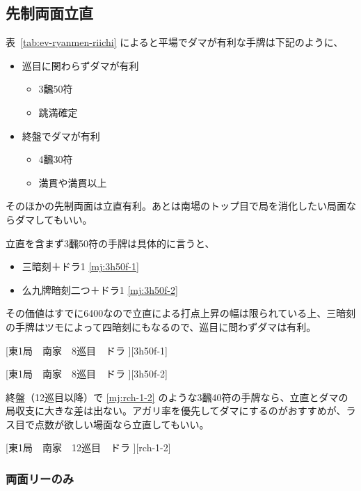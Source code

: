 \documentclass[../nankiru_main.tex]{subfiles}
\begin{document}

\subsection{先制両面立直}

表~\ref{tab:ev-ryanmen-riichi} によると平場でダマが有利な手牌は下記のように、

\begin{itemize}
  \item 巡目に関わらずダマが有利
  \begin{itemize}
    \item 3飜50符
    \item 跳満確定
  \end{itemize}
  \item 終盤でダマが有利
  \begin{itemize}
    \item 4飜30符
    \item 満貫や満貫以上
  \end{itemize}
\end{itemize}

そのほかの先制両面は立直有利。あとは南場のトップ目で局を消化したい局面ならダマしてもいい。

立直を含まず3飜50符の手牌は具体的に言うと、

\begin{itemize}
  \item 三暗刻＋ドラ1 \ref{mj:3h50f-1}
  \item 么九牌暗刻二つ＋ドラ1 \ref{mj:3h50f-2}
\end{itemize}

その価値はすでに6400なので立直による打点上昇の幅は限られている上、三暗刻の手牌はツモによって四暗刻にもなるので、巡目に問わずダマは有利。

[東1局　南家　8巡目　ドラ ][3h50f-1]

[東1局　南家　8巡目　ドラ ][3h50f-2]

終盤（12巡目以降）で \ref{mj:rch-1-2} のような3飜40符の手牌なら、立直とダマの局収支に大きな差は出ない。アガリ率を優先してダマにするのがおすすめが、ラス目で点数が欲しい場面なら立直してもいい。

[東1局　南家　12巡目　ドラ ][rch-1-2]


\subsubsection*{両面リーのみ}
\end{document}

